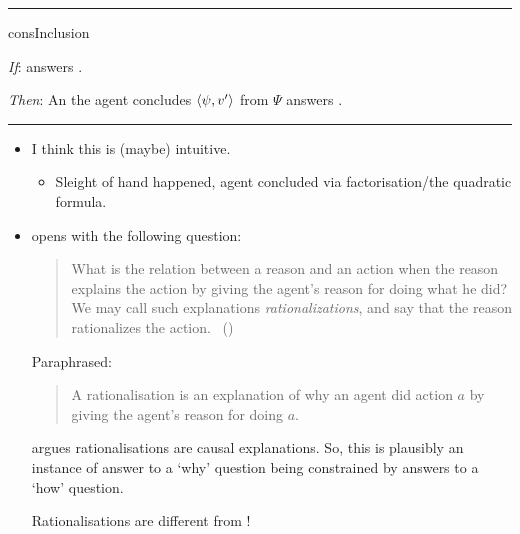 \documentclass[10pt]{article}
\newcommand\lLine{{\color{lightgray} \noindent\rule{\textwidth}{0.4pt}}}
\newcommand\sepLine{
  \vfill
  \par\noindent\rule{\textwidth}{0.4pt}
  \vfill}
\newcommand{\hand}{\ding{43}}
\begin{document}
\sepLine

\begin{note}
  \begin{constraint}{consInclusion}{\issueInclusion{}}
    \mbox{ }
    \vspace{-\baselineskip}
    \begin{itenum}
    \item[\emph{If}:]
       answers \qWhy{}.
    \item[\emph{Then}:]
      An  the agent concludes \(\langle\psi, v'\rangle\) from \(\Psi\) answers \qHow{}.
    \end{itenum}
    \vspace{-\baselineskip}
  \end{constraint}
\end{note}

\lLine

\begin{note}
  \begin{itemize}
  \item
    I think this is (maybe) intuitive.
    \begin{itemize}
    \item
      Sleight of hand happened, agent concluded via factorisation/the quadratic formula.
    \end{itemize}
  \item
    \citeauthor{Davidson:1963aa} opens  with the following question:

    \begin{quote}
      What is the relation between a reason and an action when the reason explains the action by giving the agent's reason for doing what he did?
      We may call such explanations \emph{rationalizations}, and say that the reason rationalizes the action.%
      \mbox{ }\hfill\mbox{(\citeyear[685]{Davidson:1963aa})}
    \end{quote}

    Paraphrased:
    \begin{quote}
      A rationalisation is an explanation of why an agent did action \(a\) by giving the agent's reason for doing \(a\).
    \end{quote}
    \citeauthor{Davidson:1963aa} argues rationalisations are causal explanations.
    So, this is plausibly an instance of answer to a `why' question being constrained by answers to a `how' question.
  \item[\hand]
    Rationalisations are different from !
  \end{itemize}
\end{note}
\end{document}
